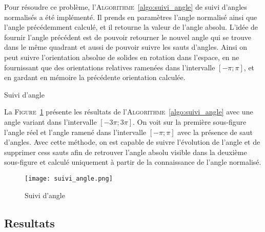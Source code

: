     Pour résoudre ce problème, l'\textsc{Algorithme}~\ref{algo:suivi_angle} de suivi d'angles normalisés a été implémenté. Il prends en paramètres l'angle normalisé ainsi que l'angle précédemment calculé, et il retourne la valeur de l'angle absolu. L'idée de fournir l'angle précédent est de pouvoir retourner le nouvel angle qui se trouve dans le même quadrant et aussi de pouvoir suivre les sauts d'angles. Ainsi on peut suivre l'orientation absolue de solides en rotation dans l'espace, en ne fournissant que des orientations relatives ramenées dans l'intervalle $[-\pi; \pi]$, et en gardant en mémoire la précédente orientation calculée.
    
    \begin{algorithm}[!htb]

        \caption{Suivi d'angle} 
        \label{algo:suivi_angle}
    \end{algorithm}

    La \textsc{Figure}~\ref{fig:suivi_angle} présente les résultats de l'\textsc{Algorithme}~\ref{algo:suivi_angle} avec une angle variant dans l'intervalle $[-3\pi; 3\pi]$. On voit sur la première sous-figure l'angle réel et l'angle ramené dans l'intervalle $[-\pi; \pi]$ avec la présence de saut d'angles. Avec cette méthode, on est capable de suivre l'évolution de l'angle et de supprimer cess sauts afin de retrouver l'angle absolu visible dans la deuxième sous-figure et calculé uniquement à partir de la connaissance de l'angle normalisé.

    \begin{figure}[!htb]
        \centering
        \texttt{[image: suivi\_angle.png]}
        \caption{Suivi d'angle}
        \label{fig:suivi_angle}
    \end{figure}


\subsection{Resultats}
